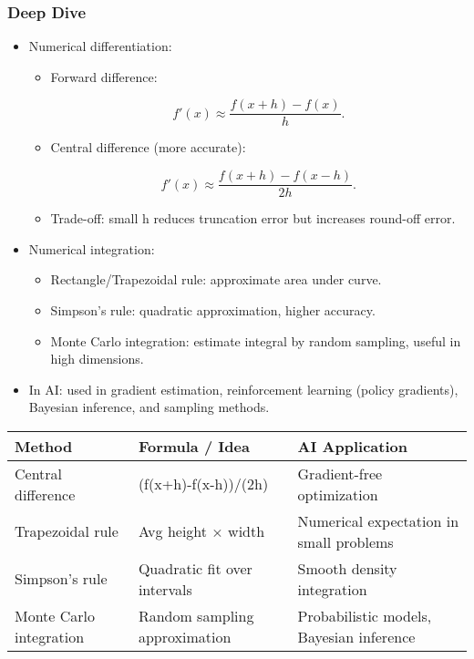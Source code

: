 \documentclass[
  letterpaper,
  DIV=11,
  numbers=noendperiod]{scrreprt}
\providecommand{\tightlist}{%
  \setlength{\itemsep}{0pt}\setlength{\parskip}{0pt}}
\begin{document}
\subsubsection{Deep Dive}\label{deep-dive-154}

\begin{itemize}
\item
  Numerical differentiation:

  \begin{itemize}
  \item
    Forward difference:

    \[
    f'(x) \approx \frac{f(x+h)-f(x)}{h}.
    \]
  \item
    Central difference (more accurate):

    \[
    f'(x) \approx \frac{f(x+h)-f(x-h)}{2h}.
    \]
  \item
    Trade-off: small h reduces truncation error but increases round-off
    error.
  \end{itemize}
\item
  Numerical integration:

  \begin{itemize}
  \tightlist
  \item
    Rectangle/Trapezoidal rule: approximate area under curve.
  \item
    Simpson's rule: quadratic approximation, higher accuracy.
  \item
    Monte Carlo integration: estimate integral by random sampling,
    useful in high dimensions.
  \end{itemize}
\item
  In AI: used in gradient estimation, reinforcement learning (policy
  gradients), Bayesian inference, and sampling methods.
\end{itemize}

\begin{longtable}[]{@{}
  >{\raggedright\arraybackslash}p{}
  >{\raggedright\arraybackslash}p{}
  >{\raggedright\arraybackslash}p{}@{}}
\toprule\noalign{}
\begin{minipage}[b]{\linewidth}\raggedright
Method
\end{minipage} & \begin{minipage}[b]{\linewidth}\raggedright
Formula / Idea
\end{minipage} & \begin{minipage}[b]{\linewidth}\raggedright
AI Application
\end{minipage} \\
\midrule\noalign{}
\endhead
\bottomrule\noalign{}
\endlastfoot
Central difference & (f(x+h)-f(x-h))/(2h) & Gradient-free
optimization \\
Trapezoidal rule & Avg height × width & Numerical expectation in small
problems \\
Simpson's rule & Quadratic fit over intervals & Smooth density
integration \\
Monte Carlo integration & Random sampling approximation & Probabilistic
models, Bayesian inference \\
\end{longtable}
\end{document}
